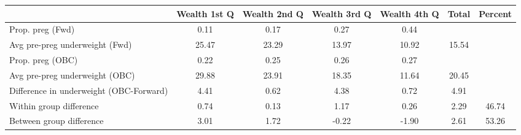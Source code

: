 \begin{tabular}{l*{6}{c}}
\toprule
            &\multicolumn{1}{c}{Wealth 1st Q}&\multicolumn{1}{c}{Wealth 2nd Q}&\multicolumn{1}{c}{Wealth 3rd Q}&\multicolumn{1}{c}{Wealth 4th Q}&\multicolumn{1}{c}{Total}&\multicolumn{1}{c}{Percent}\\
\midrule
\midrule
Prop. preg (Fwd)&        0.11&        0.17&        0.27&        0.44&            &            \\
Avg pre-preg underweight (Fwd)&       25.47&       23.29&       13.97&       10.92&       15.54&            \\
Prop. preg (OBC)&        0.22&        0.25&        0.26&        0.27&            &            \\
Avg pre-preg underweight (OBC)&       29.88&       23.91&       18.35&       11.64&       20.45&            \\
Difference in underweight (OBC-Forward)&        4.41&        0.62&        4.38&        0.72&        4.91&            \\
Within group difference&        0.74&        0.13&        1.17&        0.26&        2.29&       46.74\\
Between group difference&        3.01&        1.72&       -0.22&       -1.90&        2.61&       53.26\\
\bottomrule
\end{tabular}
